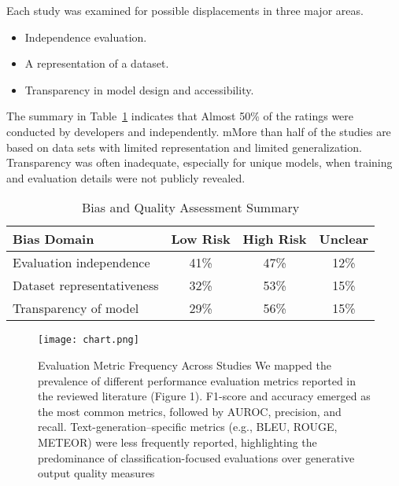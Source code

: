 \documentclass[journal]{IEEEtran}
\begin{document}
Each study was examined for possible displacements in three major areas.
\begin{itemize}
    \item Independence evaluation.
    \item A representation of a dataset.
    \item Transparency in model design and accessibility.
\end{itemize}
 The summary in Table~\ref{tab:bias_assessment} indicates that Almost 50\% of the ratings were conducted by developers and independently. mMore than half of the studies are based on data sets with limited representation and limited generalization. Transparency was often inadequate, especially for unique models, when training and evaluation details were not publicly revealed.

\begin{table}[h]
\centering
\caption{Bias and Quality Assessment Summary}
\begin{tabular}{lccc}
\hline
\textbf{Bias Domain} & \textbf{Low Risk} & \textbf{High Risk} & \textbf{Unclear} \\
\hline
Evaluation independence & 41\% & 47\% & 12\% \\
Dataset representativeness & 32\% & 53\% & 15\% \\
Transparency of model & 29\% & 56\% & 15\% \\
\hline
\end{tabular}
\label{tab:bias_assessment}
\end{table}

\begin{figure}
    \centering
    \texttt{[image: chart.png]}
    \caption{Evaluation Metric Frequency Across Studies
 We mapped the prevalence of different performance evaluation metrics reported in the reviewed literature (Figure 1). F1-score and accuracy emerged as the most common metrics, followed by AUROC, precision, and recall. Text-generation–specific metrics (e.g., BLEU, ROUGE, METEOR) were less frequently reported, highlighting the predominance of classification-focused evaluations over generative output quality measures}
    \label{fig:dataset_imbalance}
\end{figure}
\end{document}
